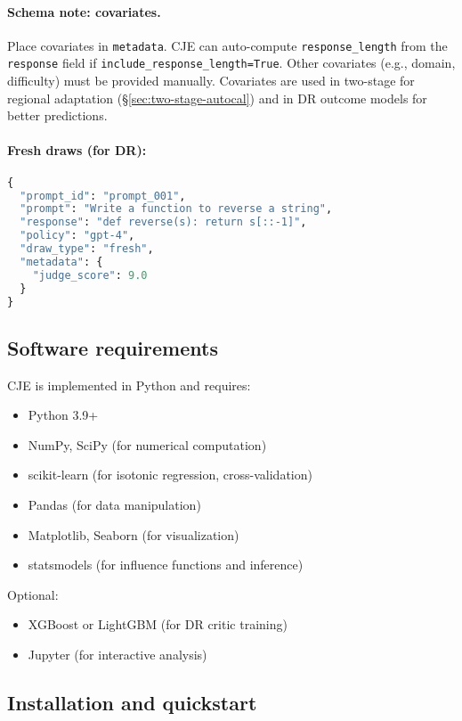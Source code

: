 \paragraph{Schema note: covariates.} Place covariates in \texttt{metadata}. CJE can auto-compute \texttt{response\_length} from the \texttt{response} field if \texttt{include\_response\_length=True}. Other covariates (e.g., domain, difficulty) must be provided manually. Covariates are used in two-stage \autocal{} for regional adaptation (\S\ref{sec:two-stage-autocal}) and in DR outcome models for better predictions.

\paragraph{Fresh draws (for DR):}
\begin{lstlisting}[language=Python,caption=Fresh Draw Schema]
{
  "prompt_id": "prompt_001",
  "prompt": "Write a function to reverse a string",
  "response": "def reverse(s): return s[::-1]",
  "policy": "gpt-4",
  "draw_type": "fresh",
  "metadata": {
    "judge_score": 9.0
  }
}
\end{lstlisting}

\subsection{Software requirements}

CJE is implemented in Python and requires:
\begin{itemize}
\item Python 3.9+
\item NumPy, SciPy (for numerical computation)
\item scikit-learn (for isotonic regression, cross-validation)
\item Pandas (for data manipulation)
\item Matplotlib, Seaborn (for visualization)
\item statsmodels (for influence functions and inference)
\end{itemize}

Optional:
\begin{itemize}
\item XGBoost or LightGBM (for DR critic training)
\item Jupyter (for interactive analysis)
\end{itemize}

\subsection{Installation and quickstart}

